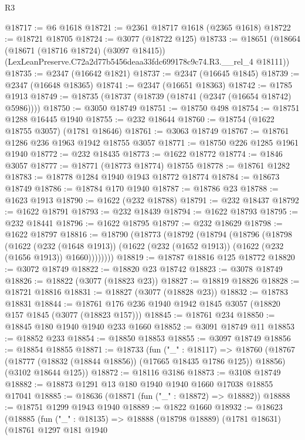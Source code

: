 \begin{lexlean}{R3}
\begin{coremodule}
@18717 := @6 @1618
@18721 := @2361 @18717 @1618 (@2365 @1618)
@18722 := @18721 @18705
@18724 := @3077 (@18722 @125)
@18733 := @18651
    (@18664
      (@18671 (@18716 @18724) (@3097 @18415))
      (LexLeanPreserve.C72a2d77b5456deaa33fdc699178c9c74.R3.__rel_4 @18111))
@18735 := @2347 (@16642 @1821)
@18737 := @2347 (@16645 @1845)
@18739 := @2347 (@16648 @18365)
@18741 := @2347 (@16651 @18363)
@18742 := @1785 @1913
@18749 := @18735 (@18737 (@18739 (@18741 (@2347 (@16654 @18742) @5986))))
@18750 := @3050 @18749
@18751 := @18750 @498
@18754 := @18751 @1288 @16445 @1940
@18755 := @232 @18644
@18760 := @18754 (@1622 @18755 @3057) (@1781 @18646)
@18761 := @3063 @18749
@18767 := @18761 @1286 @236 @1963 @1942 @18755 @3057
@18771 := @18750 @226 @1285 @1961 @1940
@18772 := @232 @18435
@18773 := @1622 @18772
@18774 := @1846 @3057
@18777 := @18771 (@18773 @18774) @18755
@18778 := @18761 @1282
@18783 := @18778 @1284 @1940 @1943 @18772 @18774
@18784 := @18673 @18749
@18786 := @18784 @170 @1940
@18787 := @18786 @23
@18788 := @1623 @1913
@18790 := @1622 (@232 @18788)
@18791 := @232 @18437
@18792 := @1622 @18791
@18793 := @232 @18439
@18794 := @1622 @18793
@18795 := @232 @18441
@18796 := @1622 @18795
@18797 := @232 @18629
@18798 := @1622 @18797
@18816 := @18790
    (@18773
      (@18792
        (@18794
          (@18796
            (@18798
              (@1622
                (@232 (@1648 @1913))
                (@1622 (@232 (@1652 @1913)) (@1622 (@232 (@1656 @1913)) @1660))))))))
@18819 := @18787 @18816 @125 @18772
@18820 := @3072 @18749
@18822 := @18820 @23 @18742
@18823 := @3078 @18749
@18826 := @18822 (@3077 (@18823 @23))
@18827 := @18819 @18826
@18828 := @18721 @18816
@18831 := @18827 (@3077 (@18828 @23))
@18832 := @18783 @18831
@18844 := @18761 @176 @236 @1940 @1942 @1845 @3057 (@18820 @157 @1845 (@3077 (@18823 @157)))
@18845 := @18761 @234
@18850 := @18845 @180 @1940 @1940 @233 @1660
@18852 := @3091 @18749 @11
@18853 := @18852 @233
@18854 := @18850 @18853
@18855 := @3097 @18749
@18856 := @18854 @18855
@18871 := @18733
    (fun ("_" : @18117) =>
    @18760
      (@18767 (@18777 (@18832 (@18844 @18856)) (@17665 @18435 @1786 @125)) @18856)
      (@3102 @18644 @125))
@18872 := @18116 @3186
@18873 := @3108 @18749
@18882 := @18873 @1291 @13 @180 @1940 @1940 @1660 @17038 @18855 @17041
@18885 := @18636 (@18871 (fun ("_" : @18872) => @18882))
@18888 := @18751 @1299 @1943 @1940
@18889 := @1822 @1660
@18932 := @18623
    (@18885
      (fun ("_" : @18135) =>
      @18888
        (@18798 @18889)
        (@1781 @18631)
        (@18761
          @1297
          @181
          @1940

\end{coremodule}
\end{lexlean}
